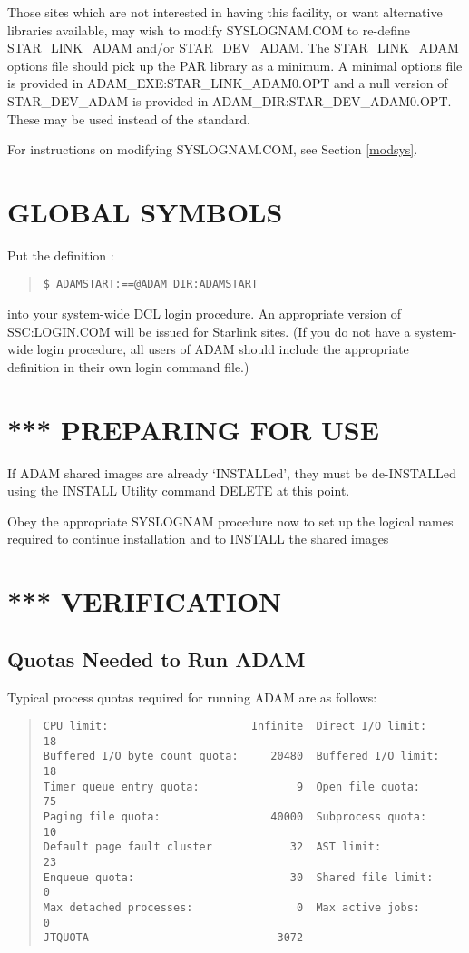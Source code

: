 Those sites which are not interested in having this facility, or want
alternative libraries available, may wish to modify SYSLOGNAM.COM to re-define
STAR\_LINK\_ADAM and/or STAR\-\_DEV\-\_ADAM.
The STAR\-\_LINK\-\_ADAM options file should pick up the PAR library as a
minimum. 
A minimal options file is provided in ADAM\_EXE:\-STAR\_LINK\_ADAM0\-.OPT
and a null version of STAR\-\_DEV\-\_ADAM is provided in 
ADAM\-\_DIR:\-STAR\-\_DEV\-\_ADAM0\-.OPT. These may be used instead of the
standard.

For instructions on modifying SYSLOGNAM.COM, see Section \ref{modsys}.

\section{GLOBAL SYMBOLS}
Put the definition :
\small \begin{quote}
\begin{verbatim}
$ ADAMSTART:==@ADAM_DIR:ADAMSTART
\end{verbatim}
\end{quote} \normalsize
into your system-wide DCL login procedure. An appropriate
version of SSC:LOGIN.COM will be issued for Starlink sites.
(If you do not have a system-wide login procedure,
all users of ADAM should include the appropriate definition in their
own login command file.)

\section{*** PREPARING FOR USE}
If ADAM shared images are already `INSTALLed', they must be de-INSTALLed
using the INSTALL Utility command DELETE at this point.

Obey the appropriate SYSLOGNAM procedure now to set up the logical names
required to continue installation and to INSTALL the shared images

\section{*** VERIFICATION}
\subsection{Quotas Needed to Run ADAM}
\label{quotas}
Typical process quotas required for running ADAM are as follows:
\small \begin{quote}
\begin{verbatim}
CPU limit:                      Infinite  Direct I/O limit:       18
Buffered I/O byte count quota:     20480  Buffered I/O limit:     18
Timer queue entry quota:               9  Open file quota:        75
Paging file quota:                 40000  Subprocess quota:       10
Default page fault cluster            32  AST limit:              23
Enqueue quota:                        30  Shared file limit:       0
Max detached processes:                0  Max active jobs:         0
JTQUOTA                             3072
\end{verbatim}
\end{quote} \normalsize


